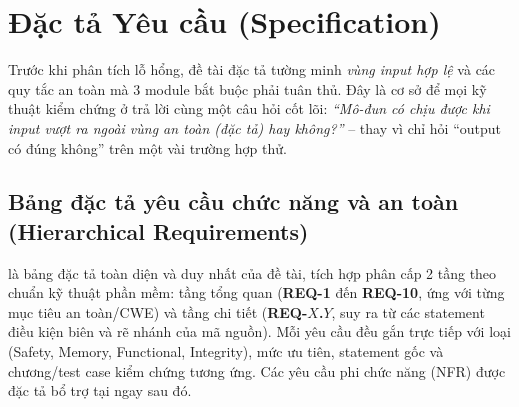 \section{Đặc tả Yêu cầu (Specification)}
\label{sec:dacta}

Trước khi phân tích lỗ hổng, đề tài đặc tả tường minh \emph{vùng input hợp lệ} và các quy tắc an toàn mà 3 module bắt buộc phải tuân thủ. Đây là cơ sở để mọi kỹ thuật kiểm chứng ở  trả lời cùng một câu hỏi cốt lõi: \emph{``Mô-đun có chịu được khi input vượt ra ngoài vùng an toàn (đặc tả) hay không?''} -- thay vì chỉ hỏi ``output có đúng không'' trên một vài trường hợp thử.

\subsection{Bảng đặc tả yêu cầu chức năng và an toàn (Hierarchical Requirements)}

 là bảng đặc tả toàn diện và duy nhất của đề tài, tích hợp phân cấp 2 tầng theo chuẩn kỹ thuật phần mềm: tầng tổng quan (\textbf{REQ-1} đến \textbf{REQ-10}, ứng với từng mục tiêu an toàn/CWE) và tầng chi tiết (\textbf{REQ-$X$.$Y$}, suy ra từ các statement điều kiện biên và rẽ nhánh của mã nguồn). Mỗi yêu cầu đều gắn trực tiếp với loại (Safety, Memory, Functional, Integrity), mức ưu tiên, statement gốc và chương/test case kiểm chứng tương ứng. Các yêu cầu phi chức năng (NFR) được đặc tả bổ trợ tại  ngay sau đó.

